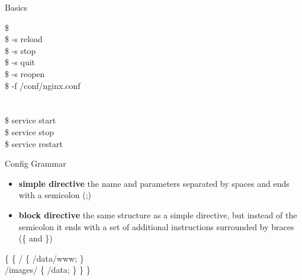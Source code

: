 \documentclass{beamer}
\begin{document}
\begin{frame}{Basics}
\begin{minipage}[t]{0.5\textwidth}
	\scriptsize
	\begin{Alms*}
		\$  \\
		\$  -s reload \\
		\$   -s stop \\
		\$  -s quit \\
		\$  -s reopen \\
		\$  -f /conf/nginx.conf \\
		\\
		\\
		\$ service  start \\
		\$ service  stop \\
		\$ service  restart \\
	\end{Alms*}
\end{minipage}
\end{frame}

\begin{frame}{Config Grammar}

\begin{minipage}[t]{0.55\textwidth}
\begin{itemize}
	\item \textbf{simple directive}  the name and parameters separated by spaces and ends with a semicolon (;)
	\item \textbf{block directive}  the same structure as a simple directive, but instead of the semicolon it ends with a set of additional instructions surrounded by braces (\{ and \})
\end{itemize}
\end{minipage}
\hfil
\begin{minipage}[t]{0.4\textwidth}
		\scriptsize
		\begin{Alms*}
			\K{http} \{ \NI
			 \{ \NI	
			 / \{ \NI
			 /data/www;
			\ND \} \\
			
			 /images/ \{ \NI
			\K{root} /data;
			\ND \}
			\ND \}
			\ND \}
		\end{Alms*}
\end{minipage}
\end{frame}
\end{document}
